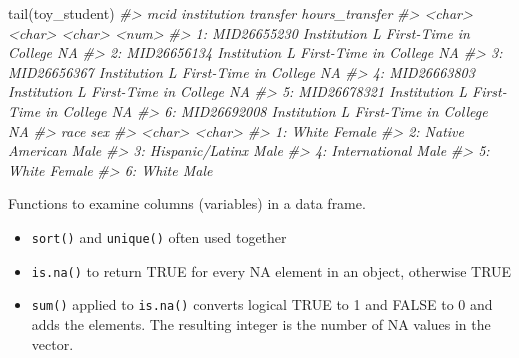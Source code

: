 \documentclass[
]{book}
\newenvironment{Shaded}{\begin{snugshade}}{\end{snugshade}}
\newcommand{\CommentTok}[1]{\textcolor[rgb]{0.56,0.35,0.01}{\textit{#1}}}
\newcommand{\FunctionTok}[1]{\textcolor[rgb]{0.00,0.00,0.00}{#1}}
\newcommand{\NormalTok}[1]{#1}
\providecommand{\tightlist}{%
  \setlength{\itemsep}{0pt}\setlength{\parskip}{0pt}}
\begin{document}
\begin{Shaded}
\begin{Highlighting}[]
\FunctionTok{tail}\NormalTok{(toy\_student)}
\CommentTok{\#\textgreater{}           mcid   institution              transfer hours\_transfer}
\CommentTok{\#\textgreater{}         \textless{}char\textgreater{}        \textless{}char\textgreater{}                \textless{}char\textgreater{}          \textless{}num\textgreater{}}
\CommentTok{\#\textgreater{} 1: MID26655230 Institution L First{-}Time in College             NA}
\CommentTok{\#\textgreater{} 2: MID26656134 Institution L First{-}Time in College             NA}
\CommentTok{\#\textgreater{} 3: MID26656367 Institution L First{-}Time in College             NA}
\CommentTok{\#\textgreater{} 4: MID26663803 Institution L First{-}Time in College             NA}
\CommentTok{\#\textgreater{} 5: MID26678321 Institution L First{-}Time in College             NA}
\CommentTok{\#\textgreater{} 6: MID26692008 Institution L First{-}Time in College             NA}
\CommentTok{\#\textgreater{}               race    sex}
\CommentTok{\#\textgreater{}             \textless{}char\textgreater{} \textless{}char\textgreater{}}
\CommentTok{\#\textgreater{} 1:           White Female}
\CommentTok{\#\textgreater{} 2: Native American   Male}
\CommentTok{\#\textgreater{} 3: Hispanic/Latinx   Male}
\CommentTok{\#\textgreater{} 4:   International   Male}
\CommentTok{\#\textgreater{} 5:           White Female}
\CommentTok{\#\textgreater{} 6:           White   Male}
\end{Highlighting}
\end{Shaded}

Functions to examine columns (variables) in a data frame.

\begin{itemize}
\tightlist
\item
  \texttt{sort()} and \texttt{unique()} often used together
\item
  \texttt{is.na()} to return TRUE for every NA element in an object, otherwise TRUE
\item
  \texttt{sum()} applied to \texttt{is.na()} converts logical TRUE to 1 and FALSE to 0 and adds the elements. The resulting integer is the number of NA values in the vector.
\end{itemize}
\end{document}
